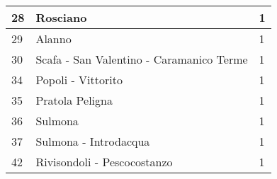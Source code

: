 \begin{table}[t]
\begin{tabular}{|p{1cm}|p{4cm}|p{2cm}|}
\rowcolor[HTML]{9AFF99} 
28  & Rosciano                                 & 1      \\ \hline
\rowcolor[HTML]{9AFF99} 
29  & Alanno                                   & 1      \\ \hline
\rowcolor[HTML]{9AFF99} 
30  & Scafa - San Valentino - Caramanico Terme & 1      \\ \hline
\rowcolor[HTML]{9AFF99} 
34  & Popoli - Vittorito                       & 1      \\ \hline
\rowcolor[HTML]{9AFF99} 
35  & Pratola Peligna                          & 1      \\ \hline
\rowcolor[HTML]{9AFF99} 
36  & Sulmona                                  & 1      \\ \hline
\rowcolor[HTML]{9AFF99} 
37  & Sulmona - Introdacqua                    & 1      \\ \hline
\rowcolor[HTML]{9AFF99} 
42  & Rivisondoli - Pescocostanzo              & 1      \\ \hline
\end{tabular}
\end{table}

